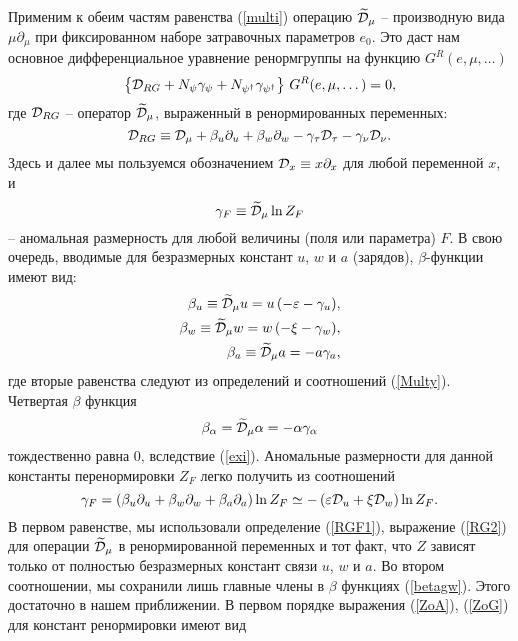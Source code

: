 \documentclass[a4paper,10pt]{article}
\def\Dm{\widetilde{\cal D}_{\mu}}
\def\D{{\cal D}}
\def\Dm{\widetilde{\cal D}_{\mu}}
\def\D{{\cal D}}
\begin{document}
Применим к обеим частям равенства (\ref{multi}) операцию
$\widetilde{\cal D}_{\mu}$ -- производную вида $\mu\partial_{\mu}$
при фиксированном наборе затравочных параметров $e_{0}$.
Это даст нам основное
дифференциальное уравнение ренормгруппы на функцию
$G^{R}(e,\mu,\dots)$
\begin{equation}
\left\{ {\cal D}_{RG} + N_{\psi}\gamma_{\psi} +
N_{\psi^{\dagger}}\gamma_{\psi^{\dagger}} \right\}
\,G^{R}(e,\mu,\dots) = 0, \label{RG1}
\end{equation}
где ${\cal D}_{RG}$ -- оператор  $\widetilde{\cal D}_{\mu}$,
выраженный в ренормированных переменных:
\begin{equation}
{\cal D}_{RG}\equiv {\cal D}_{\mu} + \beta_{u}\partial_{u} +
\beta_{w}\partial_{w} - \gamma_{\tau}{\cal D}_{\tau} -
\gamma_{\nu}{\cal D}_{\nu}.
\label{RG2}
\end{equation}
Здесь и далее мы пользуемся обозначением ${\cal D}_{x}\equiv
x\partial_{x}$ для любой переменной $x$, и
\begin{equation}
\gamma_{F}\equiv \widetilde{\cal D}_{\mu }\ln Z_{F}
\label{RGF1}
\end{equation}
-- аномальная размерность для любой величины (поля или параметра) $F$.
 В свою очередь, вводимые для безразмерных констант
$u$, $w$ и $a$ (зарядов), $\beta$-функции имеют вид:
\begin{eqnarray}
\beta_{u} \equiv \widetilde {\cal D}_{\mu} u = u\, (-\varepsilon-\gamma_{u}),
\nonumber \\
\beta_{w} \equiv \widetilde {\cal D}_{\mu} w = w\,(-\xi-\gamma_{w}),
\nonumber \\
\beta_{a} \equiv \widetilde {\cal D}_{\mu} a = -a\gamma_{a},
\label{betagw}
\end{eqnarray}
где вторые равенства следуют из определений и соотношений (\ref{Multy}).
Четвертая $\beta$ функция
\begin{eqnarray}
\beta_{\alpha}=\widetilde{\cal D}_{\mu}\alpha=-\alpha\gamma_{\alpha}
\label{Bal}
\end{eqnarray}
тождественно равна $0$, вследствие (\ref{exi}).
Аномальные размерности для данной константы перенормировки $Z_{F}$  легко получить из соотношений
 \begin{equation}
\gamma_{F} = \left( \beta_{u}\partial_{u}+\beta_{w}\partial_{w}
+\beta_{a}\partial_{a} \right)
\ln Z_{F} \simeq  - \left(\varepsilon\D_{u}+\xi\D_{w}\right) \ln Z_{F}.
\label{GfZ}
\end{equation}
В первом равенстве, мы использовали определение  (\ref{RGF1}), выражение (\ref{RG2})
для операции $\Dm$  в ренормированной переменных и тот факт, что $Z$ зависят
только от полностью безразмерных констант связи $u$, $w$ и $a$.
Во втором  соотношении, мы сохранили лишь главные члены в  $\beta$ функциях (\ref{betagw}). Этого достаточно в нашем приближении.
В первом порядке выражения (\ref{ZoA}), (\ref{ZoG}) для констант ренормировки имеют вид
\end{document}
